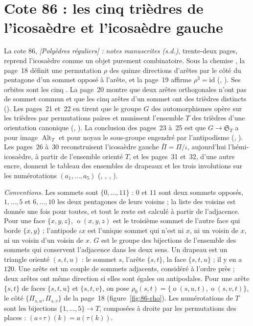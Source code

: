 \section[Cote 86 : les cinq trièdres de l'icosaèdre et l'icosaèdre gauche]{Cote 86 : les cinq trièdres de l'icosaèdre et l'icosaèdre gauche\protect{}}\label{sec:86}

La cote 86, \emph{[Polyèdres réguliers] : notes manuscrites (s.d.)}, trente-deux pages, reprend l'icosaèdre comme un objet purement combinatoire. Sous la chemise , la page~18 définit une permutation $\rho$ des quinze directions d'arêtes par le côté du pentagone d'un sommet opposé à l'arête, et la page~19 affirme $\rho^3 = \mathrm{id}$ (, ). Ses orbites sont les cinq . La page~20 montre que deux arêtes orthogonales n'ont pas de sommet commun et que les cinq arêtes d'un sommet ont des trièdres distincts (). Les pages~21 et~22 en tirent que le groupe $G$ des automorphismes opère sur les trièdres par permutations paires et munissent l'ensemble $T$ des trièdres d'une orientation canonique (, ). La conclusion des pages~23 à~25 est que $G \to \mathfrak S_T$ a pour image $\operatorname{Alt}_T$ et pour noyau le sous-groupe engendré par l'antipodisme (, ). Les pages~26 à~30 reconstruisent l'icosaèdre gauche $\bar\Pi = \Pi/\iota$, aujourd'hui l'hémi-icosaèdre, à partir de l'ensemble orienté $T$, et les pages~31 et~32, d'une autre encre, donnent le tableau des ensembles de drapeaux et les trois involutions sur les numérotations $(a_1, \ldots, a_5)$ (, , , ).

\noindent\emph{Conventions.} Les sommets sont $\{0, \ldots, 11\}$ : $0$ et $11$ sont deux sommets opposés, $1, \ldots, 5$ et $6, \ldots, 10$ les deux pentagones de leurs voisins ; la liste des voisins est donnée une fois pour toutes, et tout le reste est calculé à partir de l'adjacence. Pour une face $\{x, y, z\}$, $\operatorname{o}(x, y, z)$ est le troisième sommet de l'autre face qui borde $\{x, y\}$ ; l'antipode $\iota x$ est l'unique sommet qui n'est ni $x$, ni un voisin de $x$, ni un voisin d'un voisin de $x$. $G$ est le groupe des bijections de l'ensemble des sommets qui conservent l'adjacence dans les deux sens. Un drapeau est un triangle orienté $(s, t, u)$ : le sommet $s$, l'arête $\{s, t\}$, la face $\{s, t, u\}$ ; il y en a $120$. Une arête est un couple de sommets adjacents, considéré à l'ordre près ; deux arêtes ont même direction si elles sont égales ou antipodales. Pour une arête $\{s, t\}$ de faces $\{s, t, u\}$ et $\{s, t, v\}$, on pose $\rho_0(s, t) = \{\operatorname{o}(s, u, t), \operatorname{o}(s, v, t)\}$, le côté $\{\Pi_{s,u}, \Pi_{s,v}\}$ de la page~18 (figure~\ref{fig:86-rho}). Les numérotations de $T$ sont les bijections $\{1, \ldots, 5\} \to T$, composées à droite par les permutations des places : $(a \circ \tau)(k) = a(\tau(k))$.

